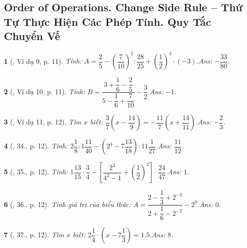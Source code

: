 \documentclass{article}
\newtheorem{baitoan}{}
\begin{document}

\subsection{Order of Operations. Change Side Rule -- Thứ Tự Thực Hiện Các Phép Tính. Quy Tắc Chuyển Vế}

\begin{baitoan}[\cite{Tuyen_Toan_7}, Ví dụ 9, p. 11]
	Tính: $A = \dfrac{2}{5} - \left(\dfrac{7}{10}\right)^2:\dfrac{28}{25} + \left(\dfrac{1}{2}\right)^3\cdot(-3)$.\hfill{\sf Ans: $-\dfrac{33}{80}$.}
\end{baitoan}

\begin{baitoan}[\cite{Tuyen_Toan_7}, Ví dụ 10, p. 11]
	Tính: $B = \dfrac{3 + \dfrac{1}{6} - \dfrac{2}{5}}{5 - \dfrac{1}{6} + \dfrac{7}{10}} - \dfrac{3}{2}$.\hfill{\sf Ans: $-1$.}
\end{baitoan}

\begin{baitoan}[\cite{Tuyen_Toan_7}, Ví dụ 11, p. 12]
	Tìm $x$ biết: $\dfrac{3}{7}\left(x - \dfrac{14}{9}\right) = -\dfrac{11}{7}\left(x + \dfrac{14}{11}\right)$.\hfill{\sf Ans: $-\dfrac{2}{3}$.}
\end{baitoan}

\begin{baitoan}[\cite{Tuyen_Toan_7}, 34., p. 12]
	Tính: $2\dfrac{1}{8}:1\dfrac{11}{40} - \left(2^4 - 7\dfrac{13}{18}\right):11\dfrac{1}{27}$.\hfill{\sf Ans: $\dfrac{11}{12}$.}
\end{baitoan}

\begin{baitoan}[\cite{Tuyen_Toan_7}, 35., p. 12]
	Tính: $1\dfrac{13}{15}\cdot\dfrac{3}{4} - \left[\dfrac{2^3}{4^2 - 1} + \left(\dfrac{1}{2}\right)^2\right]\cdot\dfrac{24}{47}$.\hfill{\sf Ans: $1$.}
\end{baitoan}

\begin{baitoan}[\cite{Tuyen_Toan_7}, 36., p. 12]
	Tính giá trị của biểu thức: $A = \dfrac{2 - \dfrac{1}{3} + 2^{-2}}{2 + \dfrac{1}{6} - 2^{-2}} - 2^0$.\hfill{\sf Ans: $0$.}
\end{baitoan}

\begin{baitoan}[\cite{Tuyen_Toan_7}, 37., p. 12]
	Tìm $x$ biết: $2\dfrac{1}{4}\cdot\left(x - 7\dfrac{1}{3}\right) = 1.5$.\hfill{\sf Ans: $8$.}
\end{baitoan}
\end{document}
